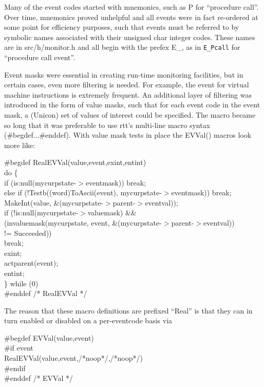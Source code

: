 Many of the event codes started with mnemonics, such as P for
``procedure call''.  Over time, mnemonics proved unhelpful and all
events were in fact re-ordered at some point for efficiency purposes,
such that events must be referred to by symbolic names associated with
their unsigned char integer codes.  These names are in src/h/monitor.h
and all begin with the prefex E\_, as in \texttt{E\_Pcall} for
``procedure call event''.

Event masks were essential in creating run-time monitoring facilities,
but in certain cases, even more filtering is needed.  For example, the
event for virtual machine instructions is extremely frequent.  An
additional layer of filtering was introduced in the form of value
masks, such that for each event code in the event mask, a (Unicon) set
of values of interest could be specified. The macro became so long
that it was preferable to use rtt's multi-line macro syntax
(\#begdef...\#enddef).    With value mask tests in
place the EVVal() macros look more like:

\begin{iconcode}
\#begdef RealEVVal(value,event,exint,entint) \\
\>   do \{ \\
\>\>    if (is:null(mycurpstate-$>$eventmask)) break; \\
\>\>    else if (!Testb((word)ToAscii(event), mycurpstate-$>$eventmask)) break; \\
\>\>    MakeInt(value, \&(mycurpstate-$>$parent-$>$eventval)); \\
\>\>      if (!is:null(mycurpstate-$>$valuemask) \&\& \\
\>\>	  (invaluemask(mycurpstate, event, \&(mycurpstate-$>$parent-$>$eventval)) \\
\>\>\>\>\>\>\>\>\>\> != Succeeded)) \\
\>\>\>	 break; \\
\>\>      exint; \\
\>      actparent(event); \\
\>      entint; \\
\>   \} while (0) \\
\#enddef					/* RealEVVal */
\end{iconcode}

The reason that these macro definitions are prefixed ``Real'' is that
they can in turn enabled or disabled on a per-eventcode basis via

\begin{iconcode}
\#begdef EVVal(value,event) \\
\#if event \\
\>   RealEVVal(value,event,/*noop*/,/*noop*/) \\
\#endif \\
\#enddef					/* EVVal */
\end{iconcode}

